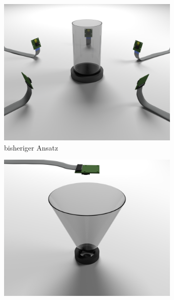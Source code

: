 


\begin{figure}[!htb]
	\centering
	\begin{subfigure}{.5\textwidth}
		\centering
		\includegraphics[width=0.95\textwidth]{images/renderCylinder.png}
		\caption{bisheriger Ansatz}
		\label{fig:oldSetup}
	\end{subfigure}%
	\begin{subfigure}{.5\textwidth}
		\centering
		\includegraphics[width=0.95\textwidth]{images/renderCone.png}

\end{subfigure}
\end{figure}
